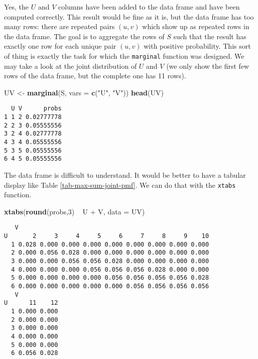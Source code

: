 \documentclass[]{book}
\newenvironment{Shaded}{\begin{snugshade}}{\end{snugshade}}
\newcommand{\KeywordTok}[1]{\textcolor[rgb]{0.13,0.29,0.53}{\textbf{{#1}}}}
\newcommand{\DataTypeTok}[1]{\textcolor[rgb]{0.13,0.29,0.53}{{#1}}}
\newcommand{\DecValTok}[1]{\textcolor[rgb]{0.00,0.00,0.81}{{#1}}}
\newcommand{\StringTok}[1]{\textcolor[rgb]{0.31,0.60,0.02}{{#1}}}
\newcommand{\NormalTok}[1]{{#1}}
\numberwithin{equation}{chapter}
\numberwithin{figure}{chapter}
\theoremstyle{plain}
\theoremstyle{definition}
\theoremstyle{remark}
\theoremstyle{definition}
\theoremstyle{definition}
\theoremstyle{remark}
\begin{document}
Yes, the \(U\) and \(V\) columns have been added to the data frame and
have been computed correctly. This result would be fine as it is, but
the data frame has too many rows: there are repeated pairs \((u,v)\)
which show up as repeated rows in the data frame. The goal is to
aggregate the rows of \(S\) such that the result has exactly one row for
each unique pair \((u,v)\) with positive probability. This sort of thing
is exactly the task for which the \texttt{marginal} function was
designed. We may take a look at the joint distribution of \(U\) and
\(V\) (we only show the first few rows of the data frame, but the
complete one has 11 rows).

\begin{Shaded}
\begin{Highlighting}[]
\NormalTok{UV <-}\StringTok{ }\KeywordTok{marginal}\NormalTok{(S, }\DataTypeTok{vars =} \KeywordTok{c}\NormalTok{(}\StringTok{"U"}\NormalTok{, }\StringTok{"V"}\NormalTok{))}
\KeywordTok{head}\NormalTok{(UV)}
\end{Highlighting}
\end{Shaded}

\begin{verbatim}
  U V      probs
1 1 2 0.02777778
2 2 3 0.05555556
3 2 4 0.02777778
4 3 4 0.05555556
5 3 5 0.05555556
6 4 5 0.05555556
\end{verbatim}

The data frame is difficult to understand. It would be better to have a
tabular display like Table \ref{tab-max-sum-joint-pmf}. We can do that
with the \texttt{xtabs} function.

\begin{Shaded}
\begin{Highlighting}[]
\KeywordTok{xtabs}\NormalTok{(}\KeywordTok{round}\NormalTok{(probs,}\DecValTok{3}\NormalTok{) ~}\StringTok{ }\NormalTok{U +}\StringTok{ }\NormalTok{V, }\DataTypeTok{data =} \NormalTok{UV)}
\end{Highlighting}
\end{Shaded}

\begin{verbatim}
   V
U       2     3     4     5     6     7     8     9    10
  1 0.028 0.000 0.000 0.000 0.000 0.000 0.000 0.000 0.000
  2 0.000 0.056 0.028 0.000 0.000 0.000 0.000 0.000 0.000
  3 0.000 0.000 0.056 0.056 0.028 0.000 0.000 0.000 0.000
  4 0.000 0.000 0.000 0.056 0.056 0.056 0.028 0.000 0.000
  5 0.000 0.000 0.000 0.000 0.056 0.056 0.056 0.056 0.028
  6 0.000 0.000 0.000 0.000 0.000 0.056 0.056 0.056 0.056
   V
U      11    12
  1 0.000 0.000
  2 0.000 0.000
  3 0.000 0.000
  4 0.000 0.000
  5 0.000 0.000
  6 0.056 0.028
\end{verbatim}
\end{document}
